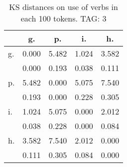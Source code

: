 \begin{table}[h!]
\begin{center}
\begin{tabular}{| l | c | c | c | c |}\hline
 & g. & p. & i. & h. \\\hline
g. & 0.000  & 5.482  & 1.024  & 3.582 \\\hline
 & 0.000  & 0.193  & 0.038  & 0.111 \\\hline
p. & 5.482  & 0.000  & 5.075  & 7.540 \\\hline
 & 0.193  & 0.000  & 0.228  & 0.305 \\\hline
i. & 1.024  & 5.075  & 0.000  & 2.012 \\\hline
 & 0.038  & 0.228  & 0.000  & 0.084 \\\hline
h. & 3.582  & 7.540  & 2.012  & 0.000 \\\hline
 & 0.111  & 0.305  & 0.084  & 0.000 \\\hline
\end{tabular}
\caption{KS distances on use of verbs in each 100 tokens. TAG: 3}
\end{center}
\end{table}